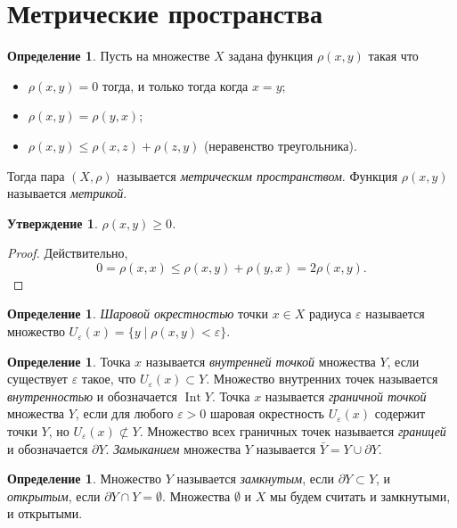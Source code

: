 \documentclass[12pt, titlepage, oneside]{amsbook}
\newcommand{\Int}{\operatorname{Int}}
\newtheorem{claim}[theorem]{Утверждение}
\theoremstyle{definition}
\newtheorem{definition}[theorem]{Определение}
\theoremstyle{remark}
\begin{document}
\section{Метрические пространства}

\begin{definition}
	Пусть на множестве $X$ задана функция $\rho(x,y)$ такая что
	\begin{itemize}
		\item $\rho(x,y)=0$ тогда, и только тогда когда $x=y$;
		\item $\rho(x,y)=\rho(y,x)$;
		\item $\rho(x,y)\leq \rho(x,z)+\rho(z,y)$ (неравенство треугольника).
	\end{itemize}
	Тогда пара $(X,\rho)$ называется \emph{метрическим пространством}. Функция $\rho(x,y)$ называется \emph{метрикой}.
\end{definition}

\begin{claim}
	\label{Met1}
	$\rho(x,y)\geq 0$.
\end{claim}

\begin{proof}
	Действительно, $$0=\rho(x,x)\leq \rho(x,y)+\rho(y,x)=2\rho(x,y).$$
\end{proof}

\begin{definition}
	\emph{Шаровой окрестностью} точки $x\in X$ радиуса $\varepsilon$ называется множество $U_{\varepsilon}(x)=\{ y\mid \rho(x,y)<\varepsilon\}$.
\end{definition}

\begin{definition}
	Точка $x$ называется \emph{внутренней точкой} множества $Y$, если существует $\varepsilon$ такое, что $U_{\varepsilon}(x)\subset Y$. Множество внутренних точек называется \emph{внутренностью} и обозначается $\Int Y$. Точка $x$ называется \emph{граничной точкой} множества $Y$, если для любого $\varepsilon>0$ шаровая окрестность $U_{\varepsilon}(x)$ содержит точки $Y$, но $U_{\varepsilon}(x)\not\subset Y$. Множество всех граничных точек называется \emph{границей} и обозначается $\partial Y$. \emph{Замыканием} множества $Y$ называется $\bar{Y}=Y\cup\partial Y$.
\end{definition}

\begin{definition}
	Множество $Y$ называется \emph{замкнутым}, если $\partial Y\subset Y$, и \emph{открытым}, если $\partial Y\cap Y=\emptyset$. Множества $\emptyset$ и $X$ мы будем считать и замкнутыми, и открытыми.
\end{definition}
\end{document}
